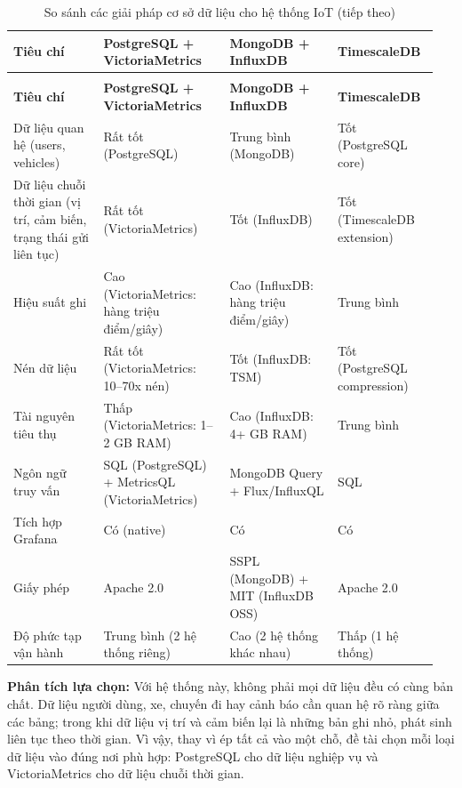 \documentclass[a4paper]{extarticle}
\newcommand{\thesissettableid}[2]{%
  \renewcommand{\thetable}{#1}%
  \renewcommand{\theHtable}{#2}%
}
\begin{document}
{\thesissettableid{2.4}{tab-ch2-iot-database-solutions}
\def\LTcaptype{table}
\begin{longtable}{|L{0.203\linewidth}|L{0.285\linewidth}|L{0.240\linewidth}|L{0.226\linewidth}|}
\caption{So sánh các giải pháp cơ sở dữ liệu cho hệ thống IoT}\label{tab:ch2-iot-database-solutions}\\
\hline \textbf{Tiêu chí} & \textbf{PostgreSQL + VictoriaMetrics} & \textbf{MongoDB + InfluxDB} & \textbf{TimescaleDB} \\
\hline
\endfirsthead
\caption[]{So sánh các giải pháp cơ sở dữ liệu cho hệ thống IoT (tiếp theo)}\\
\hline \textbf{Tiêu chí} & \textbf{PostgreSQL + VictoriaMetrics} & \textbf{MongoDB + InfluxDB} & \textbf{TimescaleDB} \\
\hline
\endhead
\hline
\endfoot
\endlastfoot
Dữ liệu quan hệ (users, vehicles) & Rất tốt (PostgreSQL) & Trung bình
(MongoDB) & Tốt (PostgreSQL core) \\\hline
Dữ liệu chuỗi thời gian (vị trí, cảm biến, trạng thái gửi liên tục) & Rất tốt (VictoriaMetrics) & Tốt
(InfluxDB) & Tốt (TimescaleDB extension) \\\hline
Hiệu suất ghi & Cao (VictoriaMetrics: hàng triệu điểm/giây) & Cao (InfluxDB:
hàng triệu điểm/giây) & Trung bình \\\hline
Nén dữ liệu & Rất tốt (VictoriaMetrics: 10--70x nén) & Tốt (InfluxDB: TSM) & Tốt
(PostgreSQL compression) \\\hline
Tài nguyên tiêu thụ & Thấp (VictoriaMetrics: 1--2 GB RAM) & Cao (InfluxDB: 4+ GB RAM)
& Trung bình \\\hline
Ngôn ngữ truy vấn & SQL (PostgreSQL) + MetricsQL (VictoriaMetrics) & MongoDB Query +
Flux/InfluxQL & SQL \\\hline
Tích hợp Grafana & Có (native) & Có & Có \\\hline
Giấy phép & Apache 2.0 & SSPL (MongoDB) + MIT (InfluxDB OSS) & Apache
2.0 \\\hline
Độ phức tạp vận hành & Trung bình (2 hệ thống riêng) & Cao (2 hệ thống
khác nhau) & Thấp (1 hệ thống) \\\hline
\end{longtable}
}

\textbf{Phân tích lựa chọn:} Với hệ thống này, không phải mọi dữ liệu
đều có cùng bản chất. Dữ liệu người dùng, xe, chuyến đi hay cảnh báo cần
quan hệ rõ ràng giữa các bảng; trong khi dữ liệu vị trí và cảm biến lại
là những bản ghi nhỏ, phát sinh liên tục theo thời gian. Vì vậy, thay vì
ép tất cả vào một chỗ, đề tài chọn mỗi loại dữ liệu vào đúng nơi phù
hợp: PostgreSQL cho dữ liệu nghiệp vụ và VictoriaMetrics cho dữ liệu
chuỗi thời gian.
\end{document}
